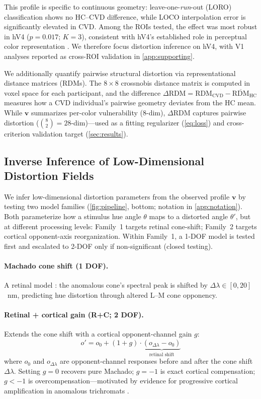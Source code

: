 \documentclass{article}
\begin{document}
This profile is specific to continuous geometry: leave-one-\emph{run}-out (LORO) classification shows no HC--CVD difference, while LOCO interpolation error is significantly elevated in CVD.
Among the ROIs tested, the effect was most robust in hV4 ($p = 0.017$; $K{=}3$), consistent with hV4's established role in perceptual color representation \citep{brouwer2009, bannert2018}.
We therefore focus distortion inference on hV4, with V1 analyses reported as cross-ROI validation in \cref{app:supporting}.

We additionally quantify pairwise structural distortion via representational distance matrices (RDMs).
The $8 \times 8$ crossnobis distance matrix is computed in voxel space for each participant, and the difference $\Delta\text{RDM} = \text{RDM}_{\text{CVD}} - \overline{\text{RDM}}_{\text{HC}}$ measures how a CVD individual's pairwise geometry deviates from the HC mean.
While $\mathbf{v}$ summarizes per-color vulnerability (8-dim), $\Delta$RDM captures pairwise distortion ($\binom{8}{2} = 28$-dim)---used as a fitting regularizer (\cref{eq:loss}) and cross-criterion validation target (\cref{sec:results}).

\subsection{Inverse Inference of Low-Dimensional Distortion Fields}

We infer low-dimensional distortion parameters from the observed profile $\mathbf{v}$ by testing two model families (\cref{fig:pipeline}, bottom; notation in \cref{app:notation}).
Both parameterize how a stimulus hue angle $\theta$ maps to a distorted angle $\theta'$, but at different processing levels: Family~1 targets retinal cone-shift; Family~2 targets cortical opponent-axis reorganization.
Within Family~1, a 1-DOF model is tested first and escalated to 2-DOF only if non-significant (closed testing).

\paragraph{Machado cone shift (1 DOF).}
A retinal model \citep{machado2009}: the anomalous cone's spectral peak is shifted by $\Delta\lambda \in [0, 20]$~nm, predicting hue distortion through altered L--M cone opponency.

\paragraph{Retinal + cortical gain (R+C; 2 DOF).}
Extends the cone shift with a cortical opponent-channel gain $g$:
\begin{equation}
o' = o_0 + (1{+}g) \cdot \underbrace{(o_{\Delta\lambda} - o_0)}_{\text{retinal shift}}
\label{eq:rc}
\end{equation}
where $o_0$ and $o_{\Delta\lambda}$ are opponent-channel responses before and after the cone shift $\Delta\lambda$.
Setting $g{=}0$ recovers pure Machado; $g{=}{-}1$ is exact cortical compensation; $g{<}{-}1$ is overcompensation---motivated by evidence for progressive cortical amplification in anomalous trichromats \citep{tregillus2021}.
\end{document}
